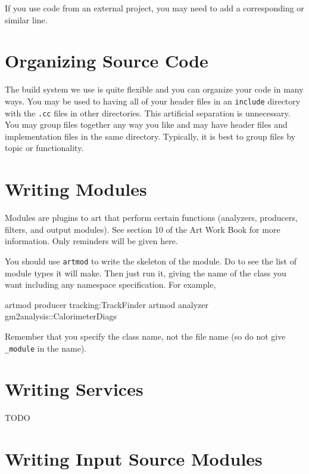 If you use code from an external project, you may need to add a
corresponding  or similar line.

\section{Organizing Source Code}
\label{sec:org_code}

The build system we use is quite flexible and you can organize your
code in  many ways. You may be used to having all of your header files
in an \texttt{include} directory with the \texttt{.cc} files in other
directories. This artificial separation is unnecessary. You may group
files together any way you like and may have header files and
implementation files in the same directory. Typically, it is best to
group files by topic or functionality. 

\section{Writing Modules}
\label{sec:writing-modules}

Modules are plugins to art that perform certain functions (analyzers,
producers, filters, and output modules). See section
10 of the Art Work Book\cite{artwkb13} for more information. Only
reminders will be given here. 

You should use \texttt{artmod} to write the skeleton of
the module. Do  to see the list of module
types it will make. Then just run it, giving the name of the class you
want including any namespace specification. For example,

\begin{cpplisting}
  artmod producer tracking:TrackFinder
  artmod analyzer gm2analysis::CalorimeterDiags
\end{cpplisting}

Remember that you specify the class name, not the file name (so do not
give \texttt{\_module} in the name). 

\section{Writing Services}
\label{sec:writing-services}

TODO

\section{Writing Input Source Modules}
\label{sec:writing-input-source}

